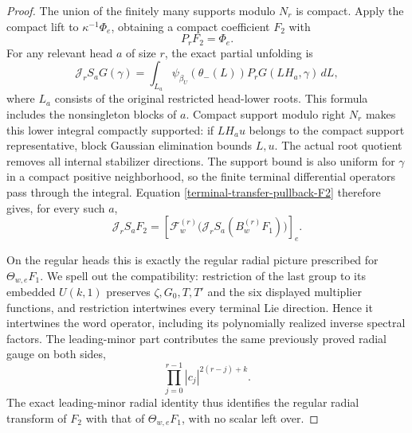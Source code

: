 \begin{proof}
The union of the finitely many supports modulo $N_r$ is
compact.  Apply the compact lift to $\kappa^{-1}\Phi_e$,
obtaining a compact coefficient $F_2$ with
\begin{equation}\label{terminal-transfer-pullback-F2}
                       P_rF_2=\Phi_e.
\end{equation}
For any relevant head $a$ of size $r$, the exact partial
unfolding is
\[
 \mathcal J_rS_aG(\gamma)
      =\int_{L_a}\psi_{\beta_U}(\theta_-(L))
                       P_rG(LH_a,\gamma)\,dL,
\]
where $L_a$ consists of the original restricted head-lower
roots.  This formula includes the nonsingleton blocks of
$a$.  Compact support modulo right $N_r$ makes this lower
integral compactly supported: if $LH_a u$ belongs to the
compact support representative, block Gaussian elimination
bounds $L,u$.  The actual root quotient removes all internal
stabilizer directions.  The support bound is also uniform
for $\gamma$ in a compact positive neighborhood, so the
finite terminal differential operators pass through the
integral.  Equation \eqref{terminal-transfer-pullback-F2}
therefore gives, for every such $a$,
\begin{equation}\label{terminal-transfer-all-slices}
 \mathcal J_rS_aF_2
       =\left[\mathcal F_w^{(r)}
                 \bigl(\mathcal J_rS_a(B_w^{(r)}F_1)\bigr)
                                                \right]_e.
\end{equation}

On the regular heads this is exactly the regular radial
picture prescribed for $\Theta_{w,e}F_1$.  We spell out
the compatibility: restriction of the last group to its
embedded $U(k,1)$ preserves $\zeta,G_0,T,T'$ and the six
displayed multiplier functions, and restriction intertwines
every terminal Lie direction.  Hence it intertwines the
word operator, including its polynomially realized inverse
spectral factors.  The leading-minor part contributes the
same previously proved radial gauge on both sides,
\[
                  \prod_{j=0}^{r-1}|c_j|^{2(r-j)+k}.
\]
The exact leading-minor radial identity thus identifies the
regular radial transform of $F_2$ with that of
$\Theta_{w,e}F_1$, with no scalar left over.


\end{proof}
